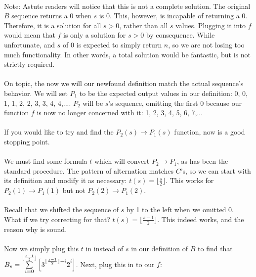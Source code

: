 \documentclass[12pt,letterpaper]{article}
\begin{document}
			\paragraph{} Note: Astute readers will notice that this is not a complete solution. The original $B$ sequence returns a 0 when $s$ is 0. This, however, is incapable of returning a 0. Therefore, it is a solution for all $s > 0$, rather than all $s$ values. Plugging it into $f$ would mean that $f$ is only a solution for $s > 0$ by consequence. While unfortunate, and $s$ of 0 is expected to simply return $n$, so we are not losing too much functionality. In other words, a total solution would be fantastic, but is not strictly required.
			
			\paragraph{} On topic, the now we will our newfound definition match the actual sequence's behavior. We will set $P_1$ to be the expected output values in our definition: 0, 0, 1, 1, 2, 2, 3, 3, 4, 4,.... $P_2$ will be $s$'s sequence, omitting the first 0 because our function $f$ is now no longer concerned with it: 1, 2, 3, 4, 5, 6, 7,...
			
			\paragraph{} If you would like to try and find the $P_2(s) \rightarrow P_1(s)$ function, now is a good stopping point.
			
			\paragraph{} We must find some formula $t$ which will convert $P_2 \rightarrow P_1$, as has been the standard procedure. The pattern of alternation matches $C$'s, so we can start with its definition and modify it as necessary: $t(s) = \lfloor \frac{s}{2} \rfloor$. This works for $P_2(1) \rightarrow P_1(1)$ but not $P_2(2) \rightarrow P_1(2)$. 
			
			\paragraph{} Recall that we shifted the sequence of $s$ by 1 to the left when we omitted 0. What if we try correcting for that? $t(s) = \lfloor \frac{s-1}{2} \rfloor $. This indeed works, and the reason why is sound.
			
			\paragraph{} Now we simply plug this $t$ in instead of $s$ in our definition of $B$ to find that $B_s = \sum\limits_{i=0}^{\lfloor \frac{s-1}{2} \rfloor} \left[3\strut^{\lfloor \frac{s-1}{2} \rfloor - i}2\strut^i \right]$. Next, plug this in to our $f$:
			
\end{document}
